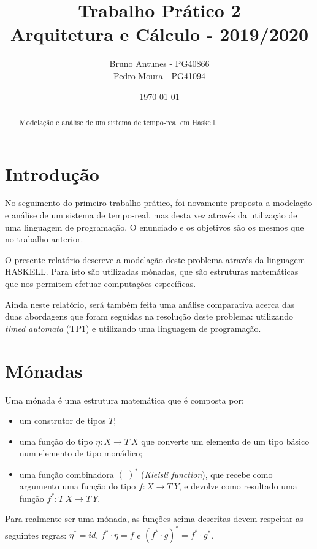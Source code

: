 \documentclass[12pt]{extarticle}
\title{Trabalho Prático 2\\
       \large{Arquitetura e Cálculo - 2019/2020}}
\author{Bruno Antunes - PG40866\\
        Pedro Moura - PG41094}
\date{\today}
\def\comp{\mathbin{\cdot}}
\begin{document}
\maketitle


\begin{abstract}
	Modelação e análise de um sistema de tempo-real em Haskell.
\end{abstract}


\tableofcontents

\newpage

\section{Introdução}
\label{sec:introducao}
No seguimento do primeiro trabalho prático, foi novamente proposta a modelação e análise de um sistema de tempo-real, mas desta vez através da utilização de uma linguagem de programação. 
O enunciado e os objetivos são os mesmos que no trabalho anterior.

O presente relatório descreve a modelação deste problema através da linguagem HASKELL.
Para isto são utilizadas mónadas, que são estruturas matemáticas que nos permitem efetuar computações específicas.

Ainda neste relatório, será também feita uma análise comparativa acerca das duas abordagens que foram seguidas na resolução deste problema: utilizando \textit{timed automata} (TP1) e utilizando uma linguagem de programação.

\section{Mónadas}
Uma mónada é uma estrutura matemática que é composta por:
\begin{itemize}
    \item um construtor de tipos $T$;
    \item uma função do tipo $\eta: X \rightarrow T\ X$ que converte um elemento de um tipo básico num elemento de tipo monádico;
    \item uma função combinadora $(\_)^*$ (\textit{Kleisli function}), que recebe como argumento uma função do tipo $f: X \rightarrow T\ Y$, e devolve como resultado uma função $f^*: T\ X \rightarrow T\ Y$.
\end{itemize}

Para realmente ser uma mónada, as funções acima descritas devem respeitar as seguintes regras: $\eta^* = id$, $f^* \comp \eta = f$ e $(f^* \comp g)^* = f^* \comp g^*$.
\end{document}
